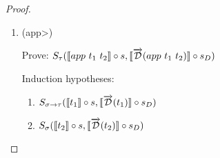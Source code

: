 \documentclass[11pt, final]{article}
\begin{document}
\begin{proof}
\begin{enumerate}
\begin{itemize}
          \begin{align*}
            S&_\tau(\llbracket var\ (Pop\ v) \rrbracket \circ s, \llbracket \D(var\ (Pop\ v)) \rrbracket \circ s_D) \\
            &\Vdash \text{(Definition of $\D$)} \\
            & S_\tau(\llbracket var\ (Pop\ v) \rrbracket \circ s, \llbracket var\ (Pop\ v) \rrbracket \circ s_D) \\
            &\Vdash \text{(Definition of $\circ$)} \\
            & S_\tau(\lambda x. \llbracket var\ (Pop\ v) \rrbracket (s(x)), \lambda x. \llbracket var\ (Pop\ v) \rrbracket (s_D(x))) \\
            &\Vdash \text{(Definition of $\llbracket\rrbracket$)} \\
            & S_\tau(\lambda x. lookup\ \llbracket Pop\ v \rrbracket (s(x)), \lambda x. lookup\ \llbracket Pop\ v \rrbracket (s_D(x))) \\
            &\Vdash \text{(Rewrite using $s = \lambda x. hd(s(x))::tl(s(x))$)} \\
            & S_\tau(\lambda x. lookup\ \llbracket Pop\ v \rrbracket (hd(s(x))::tl(s(x))), \\
              & \;\;\; \lambda x. lookup\ \llbracket Pop\ v \rrbracket (hd(s_D(x))::tl(s_D(x)))) \\
            & \Vdash \text{(Simplify with lookup and $\llbracket Pop\ v \rrbracket$)} \\
            & S_\tau(\lambda x. lookup\ \llbracket v \rrbracket (tl(s(x))), \lambda x. lookup\ \llbracket v \rrbracket (tl(s_D(x)))) \\
            & \Vdash \text{(Use IH. \ref{eqn:subst_ih_var_Pop} with $f = tl(s(x))$ and $g = tl(s_D(x))$)}
          \end{align*} \qed
        \end{itemize}
      \item (\<app>)

        Prove: $S_\tau(\llbracket app\ t_1\ t_2 \rrbracket \circ s, \llbracket \overrightarrow{\mathcal{D}}(app\ t_1\ t_2) \rrbracket \circ s_D)$

        Induction hypotheses:
        \begin{enumerate}
          \item \label{eqn:subst_ih_app1}$S_{\sigma\rightarrow\tau}(\llbracket t_1 \rrbracket \circ s, \llbracket \overrightarrow{\mathcal{D}}(t_1) \rrbracket \circ s_D)$
          \item \label{eqn:subst_ih_app2}$S_{\sigma}(\llbracket t_2 \rrbracket \circ s, \llbracket \overrightarrow{\mathcal{D}}(t_2) \rrbracket \circ s_D)$
        \end{enumerate}


\end{enumerate}
\end{proof}
\end{document}
